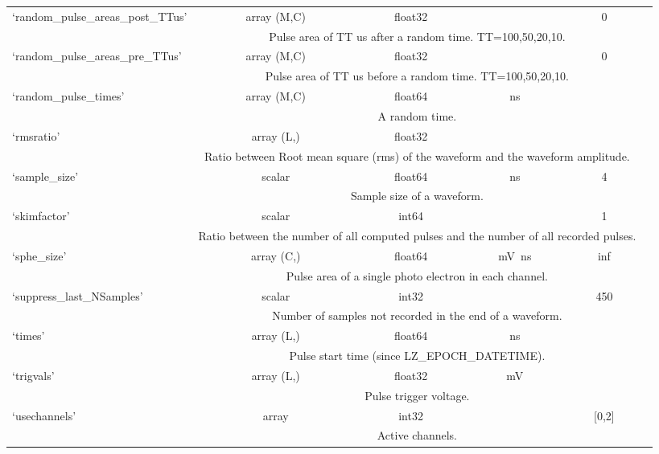 \begin{center}
\begin{longtable}[!htbp]{|l||*{5}{c|}}
		
	 	`random\_pulse\_areas\_post\_TTus'& array (M,C) & float32 & \si{\phe} & 0 \\\cline{2-6} & \multicolumn{4}{m{27em}|}{Pulse area of TT us after a random time. TT=100,50,20,10.}\\\hline
	 	`random\_pulse\_areas\_pre\_TTus' & array (M,C) & float32 & \si{\phe} & 0 \\\cline{2-6} & \multicolumn{4}{m{27em}|}{Pulse area of TT us before a random time. TT=100,50,20,10.}\\\hline
	 	`random\_pulse\_times' & array (M,C) & float64 &\si{\ns}& \si{\nan} \\\cline{2-6} & \multicolumn{4}{m{27em}|}{A random time.}\\\hline
	 	`rmsratio'  & array (L,) & float32 &  &  \\\cline{2-6} & \multicolumn{4}{m{27em}|}{Ratio between Root mean square (rms) of the waveform and the waveform amplitude.}\\\hline
	 	`sample\_size' & scalar & float64 & \si{\ns} & 4 \\\cline{2-6} & \multicolumn{4}{m{27em}|}{Sample size of a waveform.}\\\hline
	 	`skimfactor' & scalar & int64 & & 1 \\\cline{2-6} & \multicolumn{4}{m{27em}|}{Ratio between the number of all computed pulses and the number of all recorded pulses.}\\\hline
	 	`sphe\_size'& array (C,) & float64 & \si{\mV\ns} & inf \\\cline{2-6} & \multicolumn{4}{m{27em}|}{Pulse area of a single photo electron in each channel.}\\\hline
	 	`suppress\_last\_NSamples' & scalar & int32 &  & 450 \\\cline{2-6} & \multicolumn{4}{m{27em}|}{Number of samples not recorded in the end of a waveform.}\\\hline
	 	`times' & array (L,) & float64 & \si{\ns}&  \\\cline{2-6} & \multicolumn{4}{m{27em}|}{Pulse start time (since LZ\_EPOCH\_DATETIME). }\\\hline
	 	`trigvals' & array (L,) & float32 & \si{\mV} & \si{\nan} \\\cline{2-6} & \multicolumn{4}{m{27em}|}{Pulse trigger voltage. }\\\hline
	 	`usechannels'& array & int32 &  & [0,2] \\\cline{2-6} & \multicolumn{4}{m{27em}|}{Active channels.}\\\hline

\end{longtable}
\end{center}
